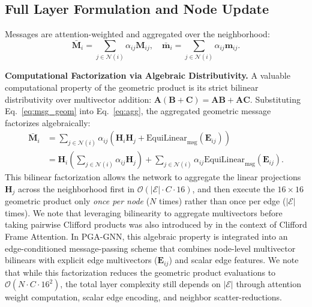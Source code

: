 \documentclass[10pt]{article}
\begin{document}
\subsection{Full Layer Formulation and Node Update}
\label{subsec:update}

\noindent
Messages are attention-weighted and aggregated over the neighborhood:
\begin{equation}
    \bar{\mathbf{M}}_i = \sum_{j \in \mathcal{N}(i)} \alpha_{ij} \mathbf{M}_{ij}, \quad \bar{\mathbf{m}}_i = \sum_{j \in \mathcal{N}(i)} \alpha_{ij} \mathbf{m}_{ij}.
    \label{eq:agg}
\end{equation}

\noindent\textbf{Computational Factorization via Algebraic Distributivity.}
A valuable computational property of the geometric product is its strict bilinear distributivity over multivector addition: $\mathbf{A}(\mathbf{B} + \mathbf{C}) = \mathbf{A}\mathbf{B} + \mathbf{A}\mathbf{C}$. 
Substituting Eq.~\ref{eq:msg_geom} into Eq.~\ref{eq:agg}, the aggregated geometric message factorizes algebraically:
\begin{align}
    \bar{\mathbf{M}}_i 
    &= \sum_{j \in \mathcal{N}(i)} \alpha_{ij} \left( \mathbf{H}_i \mathbf{H}_j + \mathrm{EquiLinear}_{\text{msg}}(\mathbf{E}_{ij}) \right) \nonumber \\
    &= \mathbf{H}_i \left( \sum_{j \in \mathcal{N}(i)} \alpha_{ij} \mathbf{H}_j \right) + \sum_{j \in \mathcal{N}(i)} \alpha_{ij} \mathrm{EquiLinear}_{\text{msg}}(\mathbf{E}_{ij}).
    \label{eq:distributivity_factorization}
\end{align}
This bilinear factorization allows the network to aggregate the linear projections $\mathbf{H}_j$ across the neighborhood first in $\mathcal{O}(|\mathcal{E}| \cdot C \cdot 16)$, and then execute the $16 \times 16$ geometric product only \emph{once per node} ($N$ times) rather than once per edge ($|\mathcal{E}|$ times). We note that leveraging bilinearity to aggregate multivectors before taking pairwise Clifford products was also introduced by \citet{gafl} in the context of Clifford Frame Attention. In PGA-GNN, this algebraic property is integrated into an edge-conditioned message-passing scheme that combines node-level multivector bilinears with explicit edge multivectors ($\mathbf{E}_{ij}$) and scalar edge features. 
We note that while this factorization reduces the geometric product evaluations to $\mathcal{O}(N \cdot C \cdot 16^2)$, the total layer complexity still depends on $|\mathcal{E}|$ through attention weight computation, scalar edge encoding, and neighbor scatter-reductions.
\end{document}

